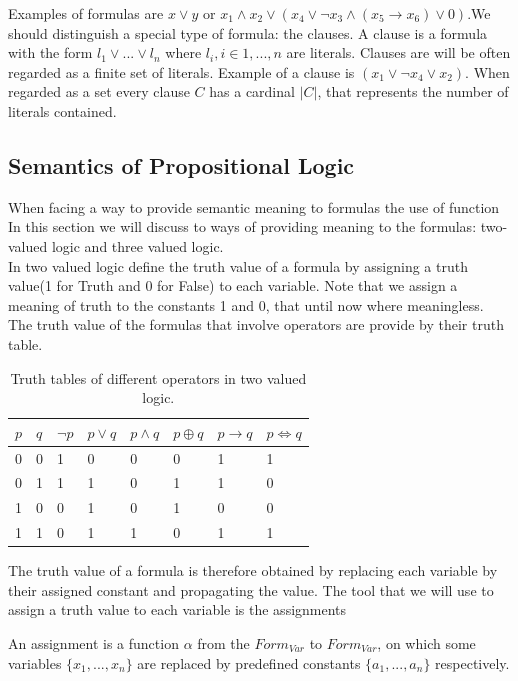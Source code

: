 Examples of formulas are $x\vee y$ or $x_1\wedge x_2 \vee  ( x_4 \vee \neg  x_3 \wedge (x_5\to x_6) \vee 0 )$.We should distinguish a special type of formula: the clauses. A clause  is a formula with the form $l_1\vee ... \vee l_n$ where $l_i, i \in 1,...,n$ are literals. Clauses are will be often regarded as a finite set of literals. Example of a clause is $(x_1\vee \neg x_4 \vee x_2)$. When regarded as a set every clause $C$ has a cardinal $|C|$, that represents the number of literals contained. \\

\subsection{Semantics of Propositional Logic}
When facing a way to provide semantic meaning to formulas the use of function In this section we will discuss to ways of providing meaning to the formulas: two-valued logic and three valued logic.\\ 

In two valued logic define the truth value of a formula by assigning a truth value(1 for Truth and 0 for False) to each variable. Note that we assign a meaning of truth to the constants 1 and 0, that until now where meaningless. The truth value of the formulas that involve operators are provide by their truth table.


\begin{table}[h]
  \begin{center}
    \begin{tabular}{|l|l|l|l|l|l|l|l|}
      \hline
      $p$ & $q$ & $\neg p$& $p\vee q$ & $p\wedge q$ & $p \oplus q$ & $p \to q $ & $p \iff q$  \\ 
      \hline
      0 & 0 & 1 & 0 & 0 & 0 & 1&1\\
      0 & 1 & 1 & 1 & 0 & 1 & 1&0\\
      1 & 0 & 0 & 1 & 0 & 1 & 0&0\\
      1 & 1 & 0 & 1 & 1 & 0 & 1&1\\\hline
    \end{tabular}
  \end{center}
  \caption{\label{tab:table-name}Truth tables of different operators in two valued logic.}
\end{table}


The truth value of a formula is therefore obtained by replacing each variable by their assigned constant and propagating the value. The tool that we will use to assign a truth value to each variable is the assignments
\begin{definition}
  An assignment is a function $\alpha$ from the $Form_{Var}$ to $Form_{Var}$, on which some variables $\{x_1,...,x_n \}$ are replaced by predefined constants $\{a_1,...,a_n\}$ respectively.\\
\end{definition}


